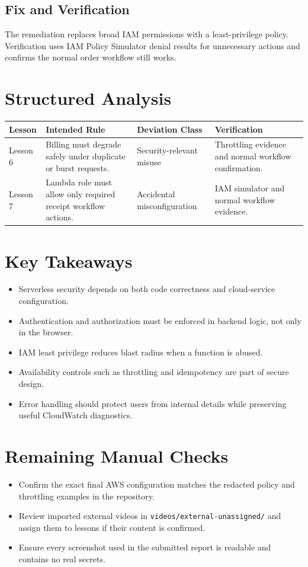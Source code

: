 \documentclass[12pt]{article}
\begin{document}
\subsection*{Fix and Verification}
The remediation replaces broad IAM permissions with a least-privilege policy. Verification uses IAM Policy Simulator denial results for unnecessary actions and confirms the normal order workflow still works.

\section*{Structured Analysis}

\begin{longtable}{p{}p{}p{}p{}}
\toprule
Lesson & Intended Rule & Deviation Class & Verification \\
\midrule
Lesson 6 & Billing must degrade safely under duplicate or burst requests. & Security-relevant misuse & Throttling evidence and normal workflow confirmation. \\
Lesson 7 & Lambda role must allow only required receipt workflow actions. & Accidental misconfiguration & IAM simulator and normal workflow evidence. \\
\bottomrule
\end{longtable}

\section*{Key Takeaways}

\begin{itemize}
  \item Serverless security depends on both code correctness and cloud-service configuration.
  \item Authentication and authorization must be enforced in backend logic, not only in the browser.
  \item IAM least privilege reduces blast radius when a function is abused.
  \item Availability controls such as throttling and idempotency are part of secure design.
  \item Error handling should protect users from internal details while preserving useful CloudWatch diagnostics.
\end{itemize}

\section*{Remaining Manual Checks}

\begin{itemize}
  \item Confirm the exact final AWS configuration matches the redacted policy and throttling examples in the repository.
  \item Review imported external videos in \texttt{videos/external-unassigned/} and assign them to lessons if their content is confirmed.
  \item Ensure every screenshot used in the submitted report is readable and contains no real secrets.
\end{itemize}
\end{document}
